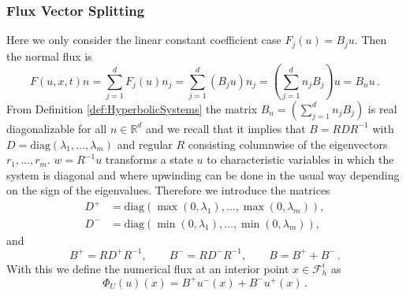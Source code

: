 \documentclass[a4paper,12pt]{article}
\theoremstyle{definition}
\theoremstyle{definition}
\newcommand{\Dim}{d}
\begin{document}
\subsubsection{Flux Vector Splitting}

Here we only consider the linear constant coefficient case $F_j(u) = B_j u$. Then the normal flux is
\begin{equation}
F(u,x,t)n = \sum_{j=1}^{\Dim} F_j(u) n_j = \sum_{j=1}^{\Dim} (B_j u) n_j
=\left( \sum_{j=1}^{\Dim} n_j B_j\right) u = B_n u \, .
\end{equation}
From Definition \ref{def:HyperbolicSystems} the matrix $B_n = \left( \sum_{j=1}^{\Dim} n_j B_j\right)$
is real diagonalizable for all $n\in\mathbb{R}^{\Dim}$ and we recall
that it implies that $B=RDR^{-1}$ with $D=\text{diag}(\lambda_1,\ldots,\lambda_m)$
and regular $R$ consisting columnwise of the eigenvectors $r_1,\ldots,r_m$.
$w=R^{-1} u$ transforms a state $u$ to characteristic variables in which the system
is diagonal and where upwinding can be done in the usual way depending on the 
sign of the eigenvalues. Therefore we introduce the matrices
\begin{align*}
D^+&=\text{diag}(\max(0,\lambda_1),\ldots,\max(0,\lambda_m)), \\
D^-&=\text{diag}(\min(0,\lambda_1),\ldots,\min(0,\lambda_m)),
\end{align*} 
and
\begin{equation}
B^+ = RD^+R^{-1}, \qquad B^- = RD^-R^{-1}, \qquad B = B^+ + B^- \, .
\end{equation}
With this we define the numerical flux at an interior point $x\in\mathcal{F}_h^i$ as
\begin{equation}\label{eq:system_upwind}
\Phi_U(u)(x) = B^+ u^-(x) + B^- u^+(x) \, .
\end{equation}

\end{document}
